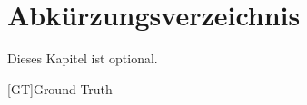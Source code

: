 \chapter{Abkürzungsverzeichnis}

Dieses Kapitel ist optional.

\begin{acronym}[AAPC]
	[GT]{Ground Truth}
\end{acronym}